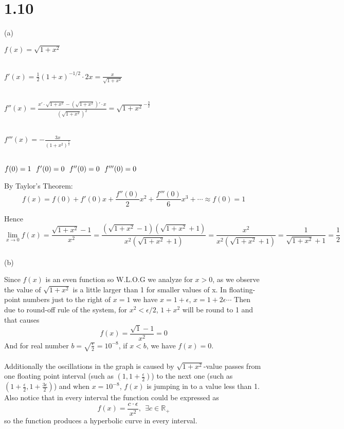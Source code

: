 \documentclass[]{article}
\begin{document}
\section *{1.10}
(a)
\par $f(x) = \sqrt{1+x^2}$\\\\
\par $f'(x) = \frac{1}{2}(1+x)^{-1/2}\cdot2x=\frac{x}{\sqrt{1+x^2}}$\\\\
\par $f''(x) = \frac{x'\cdot\sqrt{1+x^2}-(\sqrt{1+x^2})'\cdot x}{(\sqrt{1+x^2})^2}=\sqrt{1+x^2}^{-\frac{3}{2}}$\\\\
\par $f'''(x) = -\frac{3x}{(1+x^2)^\frac{5}{2}}$\\\\
\par $f(0)=1 \ \ f'(0)=0 \ \ f''(0)=0 \ \ f'''(0)=0\\\\$
\par By Taylor's Theorem:$$f(x) = f(0)+f'(0)x+\frac{f''(0)}{2}x^2+\frac{f'''(0)}{6}x^3+\cdots \approx f(0) = 1$$
\par Hence $$\displaystyle{\lim_{x\to 0}f(x)}=\frac{\sqrt{1+x^2}-1}{x^2}=\frac{(\sqrt{1+x^2}-1)(\sqrt{1+x^2}+1)}{x^2(\sqrt{1+x^2}+1)}=\frac{x^2}{x^2(\sqrt{1+x^2}+1)}=\frac{1}{\sqrt{1+x^2}+1}=\frac{1}{2}$$\\
(b)
\par Since $f(x)$ is an even function so W.L.O.G we analyze for $x>0$, as we observe the value of $\sqrt{1+x^2}$ is a little larger than 1 for smaller values of x. In floating-point numbers just to the right of $x=1$ we have $x=1+\epsilon$, $x=1+2\epsilon\cdots$ Then due to round-off rule of the system, for $x^2<\epsilon/2$, $1+x^2$ will be round to 1 and that causes $$f(x)=\frac{\sqrt{1}-1}{x^2}=0$$ And for real number $b=\sqrt{\frac{\epsilon}{2}}=10^{-8}$, if $x<b$, we have $f(x)=0$. \\\\Additionally the oscillations in the graph is caused by $\sqrt{1+x^2}$-value passes from one floating point interval (such as $(1,1+\frac{\epsilon}{2})$) to the next one (such as $(1+\frac{\epsilon}{2},1+\frac{3\epsilon}{2})$) and when $x=10^{-8}$,  $f(x)$ is jumping in to a value less than 1. Also notice that in every interval the function could be expressed as $$f(x)=\frac{c\cdot\epsilon}{x^2}, \  \ \exists c\in\mathbb{R_+}$$ so the function produces a hyperbolic curve in every interval.
\newpage
\end{document}
